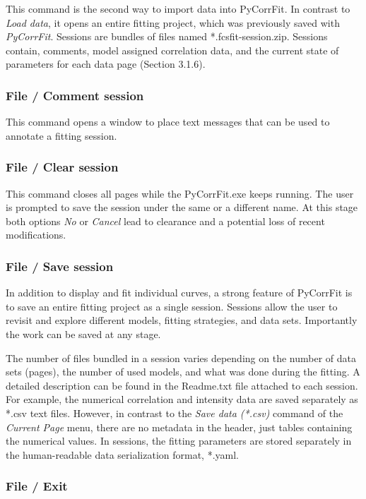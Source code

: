 This command is the second way to import data into PyCorrFit. In contrast to \textit{Load data}, it opens an entire fitting project, which was previously saved with \textit{PyCorrFit}. Sessions are bundles of files named *.fcsfit-session.zip. Sessions contain, comments, model assigned correlation data, and the current state of parameters for each data page (Section 3.1.6).

\subsubsection{File / Comment session}

This command opens a window to place text messages that can be used to annotate a fitting session.

\subsubsection{File / Clear session}

This command closes all pages while the PyCorrFit.exe keeps running. The user is prompted to save the session under the same or a different name. At this stage both options \textit{No} or \textit{Cancel} lead to clearance and a potential loss of recent modifications.

\subsubsection{File / Save session}

In addition to display and fit individual curves, a strong feature of PyCorrFit is to save an entire fitting project as a single session. Sessions allow the user to revisit and explore different models, fitting strategies, and data sets. Importantly the work can be saved at any stage.

The number of files bundled in a session varies depending on the number of data sets (pages), the number of used models, and what was done during the fitting. A detailed description can be found in the Readme.txt file attached to each session. For example, the numerical correlation and intensity data are saved separately as *.csv text files. However, in contrast to the \textit{Save data (*.csv)} command of the \textit{Current Page} menu, there are no metadata in the header, just tables containing the numerical values. In sessions, the fitting parameters are stored separately in the human-readable data serialization format, *.yaml.

\subsubsection{File / Exit}

